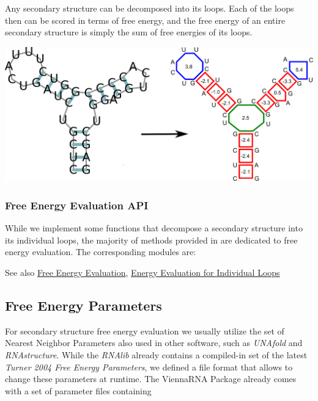 Any secondary structure can be decomposed into its loops. Each of the loops then can be scored in terms of free energy, and the free energy of an entire secondary structure is simply the sum of free energies of its loops.

 
\begin{DoxyImageNoCaption}
  \mbox{\includegraphics[width=\textwidth,height=\textheight/2,keepaspectratio=true]{loop_decomposition}}
\end{DoxyImageNoCaption}
\hypertarget{energy_evaluation_sec_loop_decomposition_api}{}\subsubsection{Free Energy Evaluation A\+PI}\label{energy_evaluation_sec_loop_decomposition_api}
While we implement some functions that decompose a secondary structure into its individual loops, the majority of methods provided in  are dedicated to free energy evaluation. The corresponding modules are\+:

\begin{DoxySeeAlso}{See also}
\hyperlink{group__eval}{Free Energy Evaluation}, \hyperlink{group__eval__loops}{Energy Evaluation for Individual Loops}
\end{DoxySeeAlso}
\hypertarget{energy_evaluation_sec_energy_parameters}{}\subsection{Free Energy Parameters}\label{energy_evaluation_sec_energy_parameters}
For secondary structure free energy evaluation we usually utilize the set of Nearest Neighbor Parameters also used in other software, such as {\itshape U\+N\+Afold} and {\itshape R\+N\+Astructure}. While the {\itshape R\+N\+Alib} already contains a compiled-\/in set of the latest {\itshape Turner 2004 Free Energy Parameters}, we defined a file format that allows to change these parameters at runtime. The {\ttfamily Vienna\+R\+NA Package} already comes with a set of parameter files containing


